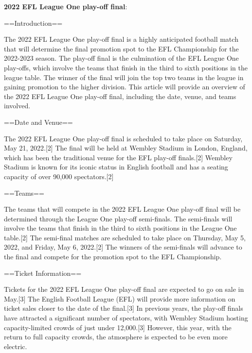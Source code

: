 \begin{tcolorbox}[title = {An example of model output}]

\textbf{2022 EFL League One play-off final}:

\begin{center}==Introduction==\end{center}
The 2022 EFL League One play-off final is a highly anticipated football match that will determine the final promotion spot to the EFL Championship for the 2022-2023 season. The play-off final is the culmination of the EFL League One play-offs, which involve the teams that finish in the third to sixth positions in the league table. The winner of the final will join the top two teams in the league in gaining promotion to the higher division. This article will provide an overview of the 2022 EFL League One play-off final, including the date, venue, and teams involved.

\begin{center}==Date and Venue==\end{center}
The 2022 EFL League One play-off final is scheduled to take place on Saturday, May 21, 2022.[2] The final will be held at Wembley Stadium in London, England, which has been the traditional venue for the EFL play-off finals.[2] Wembley Stadium is known for its iconic status in English football and has a seating capacity of over 90,000 spectators.[2]

\begin{center}==Teams==\end{center}
The teams that will compete in the 2022 EFL League One play-off final will be determined through the League One play-off semi-finals. The semi-finals will involve the teams that finish in the third to sixth positions in the League One table.[2] The semi-final matches are scheduled to take place on Thursday, May 5, 2022, and Friday, May 6, 2022.[2] The winners of the semi-finals will advance to the final and compete for the promotion spot to the EFL Championship.

\begin{center}==Ticket Information==\end{center}
Tickets for the 2022 EFL League One play-off final are expected to go on sale in May.[3] The English Football League (EFL) will provide more information on ticket sales closer to the date of the final.[3] In previous years, the play-off finals have attracted a significant number of spectators, with Wembley Stadium hosting capacity-limited crowds of just under 12,000.[3] However, this year, with the return to full capacity crowds, the atmosphere is expected to be even more electric.


\end{tcolorbox}
